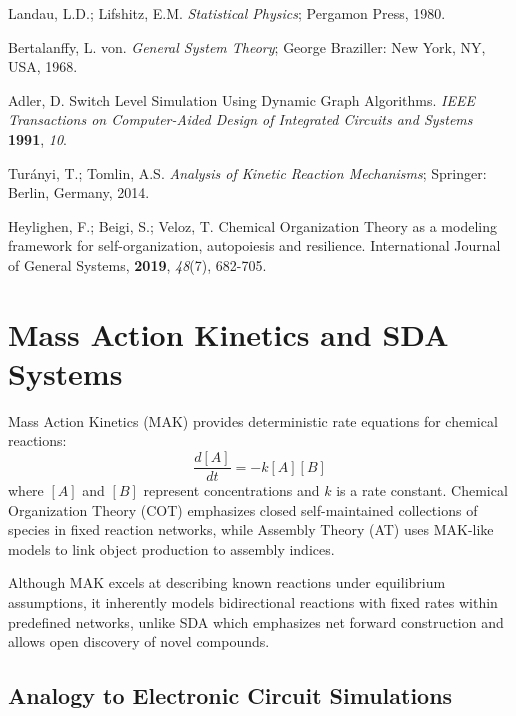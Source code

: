 \documentclass[preprint,12pt]{elsarticle}
\begin{document}
\begin{thebibliography}{999}
Landau, L.D.; Lifshitz, E.M. \textit{Statistical Physics}; Pergamon Press, 1980.

Bertalanffy, L. von. \textit{General System Theory}; George Braziller: New York, NY, USA, 1968.

Adler, D. Switch Level Simulation Using Dynamic Graph Algorithms. \textit{IEEE Transactions on Computer-Aided Design of Integrated Circuits and Systems} \textbf{1991}, \textit{10}.

Turányi, T.; Tomlin, A.S. \textit{Analysis of Kinetic Reaction Mechanisms}; Springer: Berlin, Germany, 2014.

Heylighen, F.; Beigi, S.; Veloz, T. Chemical Organization Theory as a modeling framework for self-organization, autopoiesis and resilience. International Journal of General Systems, \textbf{2019}, \textit{48}(7), 682-705.

\end{thebibliography}


\appendix

\section{Mass Action Kinetics and SDA Systems}

Mass Action Kinetics (MAK) \cite{TuranyiTomlin2014} provides deterministic rate equations for chemical reactions:
\[
\frac{d[A]}{dt} = -k [A][B]
\]
where $[A]$ and $[B]$ represent concentrations and $k$ is a rate constant. Chemical Organization Theory (COT) \cite{heylighen2019chemical} emphasizes closed self-maintained collections of species in fixed reaction networks, while Assembly Theory (AT) uses MAK-like models to link object production to assembly indices.

Although MAK excels at describing known reactions under equilibrium assumptions, it inherently models bidirectional reactions with fixed rates within predefined networks, unlike SDA which emphasizes net forward construction and allows open discovery of novel compounds.

\subsection{Analogy to Electronic Circuit Simulations}
\end{document}
